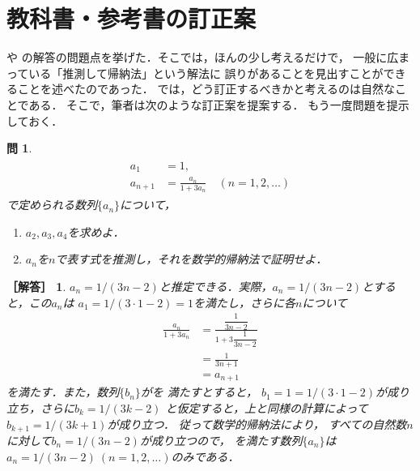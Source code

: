 \documentclass[11pt,a4paper]{ltjsarticle} %
\theoremstyle{mystyle} %
\newtheorem{que}{問} %
\newtheorem*{ans}{［解答］} %
\begin{document}
\section{教科書・参考書の訂正案}

や
の解答の問題点を挙げた．そこでは，ほんの少し考えるだけで，
一般に広まっている「推測して帰納法」という解法に
誤りがあることを見出すことができることを述べたのであった．
では，どう訂正するべきかと考えるのは自然なことである．
そこで，筆者は次のような訂正案を提案する．
もう一度問題を提示しておく．

\begin{que} \label{que:suisokuchertkai}
	\begin{align}
		\begin{aligned}
			a_1     & = 1,                                             \\
			a_{n+1} & = \frac{a_n}{1 + 3 a_n} \quad ( n = 1,2,\ldots )
		\end{aligned}
		\label{eq:zenkasikikai}
	\end{align}
	で定められる数列$\{ a_n \}$について，
	\begin{enumerate}
		\item $a_2,a_3,a_4$を求めよ．
		\item $a_n$を$n$で表す式を推測し，それを数学的帰納法で証明せよ．
	\end{enumerate}
\end{que}



\begin{ans}
	$a_n = 1/(3n-2)$と推定できる．実際，$a_n = 1/(3n-2)$とすると，この$a_n$は
	$a_1= 1/(3 \cdot 1 -2) =1$を満たし，さらに各$n$について
	\begin{align*}
		\frac{a_n}{1+ 3 a_n} & =
		\frac{ \dfrac{1}{3n-2} }{ 1+ 3 \dfrac{1}{3n-2} } \\
		                     & = \frac{1}{3n+1}          \\
		                     & = a_{n+1}
	\end{align*}
	を満たす．また，数列$\{ b_n \}$がを
	満たすとすると，
	$b_1 = 1 = 1/(3 \cdot 1 -2)$が成り立ち，さらに$b_k=1/(3k-2)$
	と仮定すると，上と同様の計算によって$b_{k+1} = 1/(3k+1)$が成り立つ．
	従って数学的帰納法により，
	すべての自然数$n$に対して$b_n = 1/(3n-2)$が成り立つので，
	を満たす数列$\{ a_n \}$は
	$a_n = 1/(3n-2) \ (n =1,2, \ldots)$のみである．
\end{ans}
\end{document}
